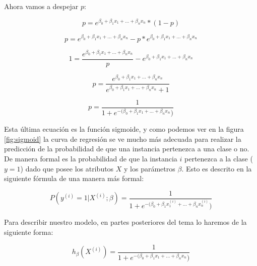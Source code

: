 \documentclass[11pt,fleqn]{book} %
\begin{document}
Ahora vamos a despejar $p$:

\begin{equation}
p = e^{\beta_0 + \beta_1 x_1 + ... + \beta_n x_n} * (1-p)
\label{eqn:suposicion_inicial_mod3} 
\end{equation}

\begin{equation}
p = e^{\beta_0 + \beta_1 x_1 + ... + \beta_n x_n} - p  * e^{\beta_0 + \beta_1 x_1 + ... + \beta_n x_n}
\label{eqn:suposicion_inicial_mod4} 
\end{equation}

\begin{equation}
1 = \frac{e^{\beta_0 + \beta_1 x_1 + ... + \beta_n x_n}}{p} - e^{\beta_0 + \beta_1 x_1 + ... + \beta_n x_n}
\label{eqn:suposicion_inicial_mod5} 
\end{equation}

\begin{equation}
p = \frac{e^{\beta_0 + \beta_1 x_1 + ... + \beta_n x_n}}{e^{\beta_0 + \beta_1 x_1 + ... + \beta_n x_n}+1} 
\label{eqn:suposicion_inicial_mod6} 
\end{equation}

\begin{equation}
p = \frac{1}{1+e^{-(\beta_0 + \beta_1 x_1 + ... + \beta_n x_n})} 
\label{eqn:suposicion_inicial_final} 
\end{equation}

Esta última ecuación es la función sigmoide, y como podemos ver en la figura \ref{fig:sigmoid} la curva de regresión se ve mucho más adecuada para realizar la predicción de la probabilidad de que una instancia pertenezca a una clase o no. De manera formal es la probabilidad de que la instancia $i$ pertenezca a la clase ($y=1$) dado que posee los atributos $X$ y los parámetros $\beta$. Esto es descrito en la siguiente fórmula de una manera más formal:

\begin{equation}
P(y^{(i)}=1 | X^{(i)};\beta) = \frac{1}{1+e^{-(\beta_0 + \beta_1 x^{(i)}_1 + ... + \beta_n x^{(i)}_n})} 
\label{eqn:suposicion_inicial_formalprob} 
\end{equation}

Para describir nuestro modelo, en partes posteriores del tema lo haremos de la siguiente forma:

\begin{equation}
h_\beta(X^{(i)}) = \frac{1}{1+e^{-(\beta_0 + \beta_1 x_1 + ... + \beta_n x_n})} 
\label{eqn:modelo_rl} 
\end{equation}
\end{document}
